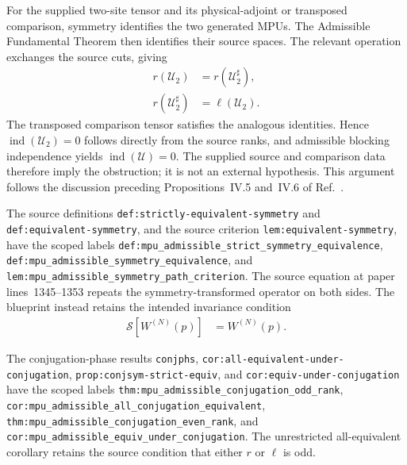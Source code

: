\documentclass{article}
\begin{document}
For the supplied two-site tensor and its physical-adjoint or transposed
comparison, symmetry identifies the two generated MPUs. The Admissible
Fundamental Theorem then identifies their source spaces. The relevant operation
exchanges the source cuts, giving
\begin{align}
    r(\mathcal U_2)
     & =r(\mathcal U_2^\sharp),
    \label{eq:mpu_canonical_form_full_support_adjoint_right_rank} \\
    r(\mathcal U_2^\sharp)
     & =\ell(\mathcal U_2).
    \label{eq:mpu_canonical_form_full_support_adjoint_cut_exchange}
\end{align}
The transposed comparison tensor satisfies the analogous identities. Hence
$\operatorname{ind}(\mathcal U_2)=0$ follows directly from the source ranks,
and admissible blocking independence yields
$\operatorname{ind}(\mathcal U)=0$. The supplied source and comparison data
therefore imply the obstruction; it is not an external hypothesis. This
argument follows the discussion preceding Propositions~IV.5 and~IV.6 of
Ref.~\cite{Cirac2017MPU}.

The source definitions \texttt{def:strictly-equivalent-symmetry} and
\texttt{def:equivalent-symmetry}, and the source criterion
\texttt{lem:equivalent-symmetry}, have the scoped labels
\texttt{def:mpu\_admissible\_strict\_symmetry\_equivalence},
\texttt{def:mpu\_admissible\_symmetry\_equivalence}, and
\texttt{lem:mpu\_admissible\_symmetry\_path\_criterion}. The source equation
at paper lines~1345--1353 repeats the symmetry-transformed operator on both
sides. The blueprint instead retains the intended invariance condition
\begin{align}
    \mathcal S[W^{(N)}(p)]
     & =W^{(N)}(p).
    \label{eq:mpu_canonical_form_full_support_symmetry_invariance}
\end{align}

The conjugation-phase results \texttt{conjphs},
\texttt{cor:all-equivalent-under-conjugation},
\texttt{prop:conjsym-strict-equiv}, and
\texttt{cor:equiv-under-conjugation} have the scoped labels
\texttt{thm:mpu\_admissible\_conjugation\_odd\_rank},
\texttt{cor:mpu\_admissible\_all\_conjugation\_equivalent},
\texttt{thm:mpu\_admissible\_conjugation\_even\_rank}, and
\texttt{cor:mpu\_admissible\_equiv\_under\_conjugation}. The unrestricted
all-equivalent corollary retains the source condition that either $r$ or
$\ell$ is odd.
\end{document}
